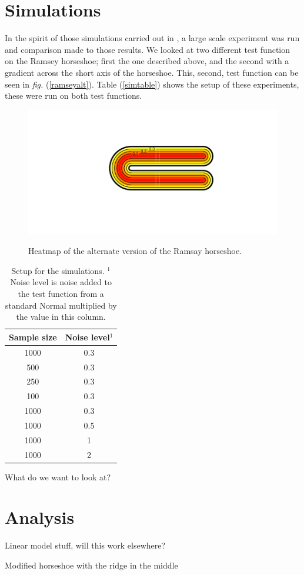 \documentclass[a4paper,10pt]{amsart}
\newcommand{\fig}[1]{\emph{fig.} (\ref{#1})}
\begin{document}
\section{Simulations}

In the spirit of those simulations carried out in \cite{soap}, a large scale experiment was run and comparison made to those results. We looked at two different test function on the Ramsey horseshoe; first the one described above, and the second with a gradient across the short axis of the horseshoe. This, second, test function can be seen in \fig{ramseyalt}. Table (\ref{simtable}) shows the setup of these experiments, these were run on both test functions.


\begin{figure}
\centering
\includegraphics[trim=1.5in 1in 0.5in 1in]{figs/altramsayhorseshoe.pdf} \\
\caption{Heatmap of the alternate version of the Ramsay horseshoe.}
\label{altramsayshorseshoe}
\end{figure}

\begin{table}[ht]
\begin{tabular}{c c}\\
Sample size & Noise level$^{1}$ \\
\hline
1000 & 0.3 \\
500 & 0.3 \\
250 & 0.3 \\
100 & 0.3 \\
1000 & 0.3 \\
1000 & 0.5 \\
1000 & 1 \\
1000 & 2 \\
\end{tabular}
\caption{Setup for the simulations. $^{1}$Noise level is noise added to the test function from a standard Normal multiplied by the value in this column. }
\end{table}


What do we want to look at?


\section{Analysis}


Linear model stuff, will this work elsewhere?





Modified horseshoe with the ridge in the middle










\end{document}
